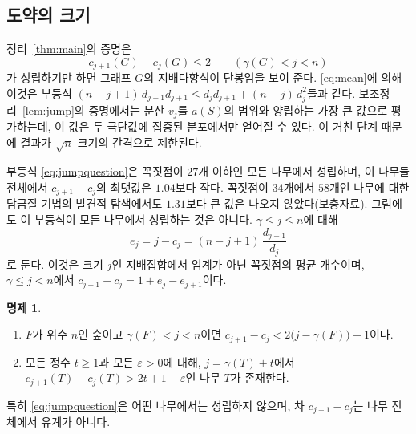 \documentclass[11pt,a4paper]{article}
\theoremstyle{definition}
\newtheorem{proposition}[theorem]{명제}
\newcommand{\MaxOrder}{27}
\newcommand{\MaxJumpValue}{1.04}
\begin{document}
\subsection*{도약의 크기}
정리~\ref{thm:main}의 증명은
\begin{equation}\label{eq:jumpquestion}
  c_{j+1}(G)-c_j(G)\le 2\qquad(\gamma(G)<j<n)
\end{equation}
가 성립하기만 하면 그래프 $G$의 지배다항식이 단봉임을 보여 준다. \eqref{eq:mean}에
의해 이것은 부등식 $(n-j+1)\,d_{j-1}d_{j+1}\le d_jd_{j+1}+(n-j)\,d_j^2$들과 같다.
보조정리~\ref{lem:jump}의 증명에서는 분산 $v_j$를 $a(S)$의 범위와 양립하는 가장 큰
값으로 평가하는데, 이 값은 두 극단값에 집중된 분포에서만 얻어질 수 있다. 이 거친
단계 때문에 결과가 $\sqrt n$ 크기의 간격으로 제한된다.

부등식 \eqref{eq:jumpquestion}은 꼭짓점이 $\MaxOrder$개 이하인 모든 나무에서 성립하며, 이
나무들 전체에서 $c_{j+1}-c_j$의 최댓값은 $\MaxJumpValue$보다 작다. 꼭짓점이 $34$개에서
$58$개인 나무에 대한 담금질 기법의 발견적 탐색에서도 $1.31$보다 큰 값은 나오지
않았다(보충자료). 그럼에도 이 부등식이 모든 나무에서 성립하는 것은 아니다.
$\gamma\le j\le n$에 대해
\[
  e_j=j-c_j=(n-j+1)\,\frac{d_{j-1}}{d_j}
\]
로 둔다. 이것은 크기 $j$인 지배집합에서 임계가 아닌 꼭짓점의 평균 개수이며,
$\gamma\le j<n$에서 $c_{j+1}-c_j=1+e_j-e_{j+1}$이다.

\begin{proposition}\label{prop:jumps}
\begin{enumerate}
\item[\textup{(i)}] $F$가 위수 $n$인 숲이고 $\gamma(F)<j<n$이면
$c_{j+1}-c_j<2\bigl(j-\gamma(F)\bigr)+1$이다.
\item[\textup{(ii)}] 모든 정수 $t\ge1$과 모든 $\varepsilon>0$에 대해, $j=\gamma(T)+t$에서
$c_{j+1}(T)-c_j(T)>2t+1-\varepsilon$인 나무 $T$가 존재한다.
\end{enumerate}
특히 \eqref{eq:jumpquestion}은 어떤 나무에서는 성립하지 않으며, 차 $c_{j+1}-c_j$는 나무
전체에서 유계가 아니다.
\end{proposition}
\end{document}
